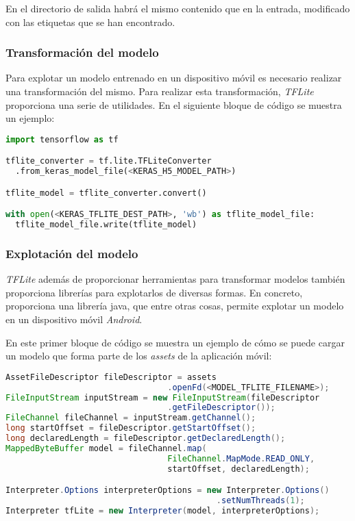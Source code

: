 En el directorio de salida habrá el mismo contenido que en la entrada, modificado con las etiquetas que se han encontrado.

\subsubsection*{Transformación del modelo}

Para explotar un modelo entrenado en un dispositivo móvil es necesario realizar una transformación del mismo. Para realizar esta transformación, \textit{TFLite} proporciona una serie de utilidades. En el siguiente bloque de código se muestra un ejemplo:

\begin{lstlisting}[frame=single, basicstyle=\ttfamily\footnotesize, language=Python, caption={Cómo transformar un modelo entrenado con \textit{Keras} a formato \textit{TFLite}}, captionpos=b]
import tensorflow as tf

tflite_converter = tf.lite.TFLiteConverter
  .from_keras_model_file(<KERAS_H5_MODEL_PATH>)

tflite_model = tflite_converter.convert()

with open(<KERAS_TFLITE_DEST_PATH>, 'wb') as tflite_model_file:
  tflite_model_file.write(tflite_model)
\end{lstlisting}

\subsubsection*{Explotación del modelo}

\textit{TFLite} además de proporcionar herramientas para transformar modelos también proporciona librerías para explotarlos de diversas formas. En concreto, proporciona una librería java, que entre otras cosas, permite explotar un modelo en un dispositivo móvil \textit{Android}.

En este primer bloque de código se muestra un ejemplo de cómo se puede cargar un modelo que forma parte de los \textit{assets} de la aplicación móvil:

\begin{lstlisting}[frame=single, basicstyle=\ttfamily\footnotesize, language=Java, caption={Cómo cargar un modelo}, captionpos=b]
AssetFileDescriptor fileDescriptor = assets
                                 .openFd(<MODEL_TFLITE_FILENAME>);
FileInputStream inputStream = new FileInputStream(fileDescriptor
                                 .getFileDescriptor());
FileChannel fileChannel = inputStream.getChannel();
long startOffset = fileDescriptor.getStartOffset();
long declaredLength = fileDescriptor.getDeclaredLength();
MappedByteBuffer model = fileChannel.map(
                                 FileChannel.MapMode.READ_ONLY,
                                 startOffset, declaredLength);

Interpreter.Options interpreterOptions = new Interpreter.Options()
                                           .setNumThreads(1);
Interpreter tfLite = new Interpreter(model, interpreterOptions);
\end{lstlisting}

